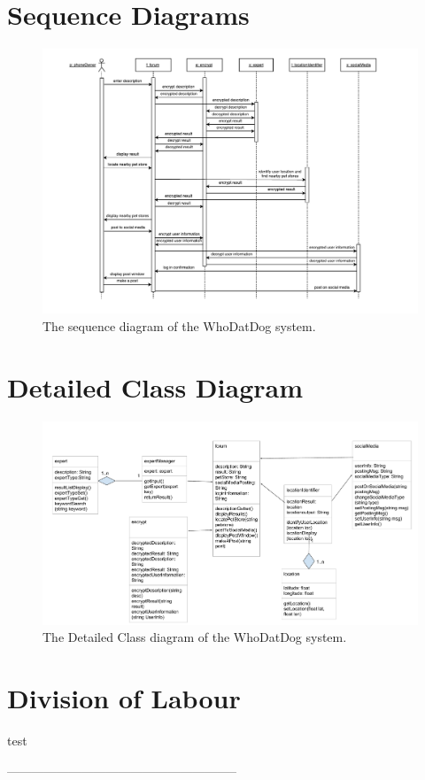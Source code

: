 \documentclass[]{article}
\begin{document}
\section{Sequence Diagrams}
\label{sec:sequence_diagrams}
\begin{figure}[H]
	\centering
	\includegraphics[width=\textwidth]{sequencediagram.pdf}
	\caption{\label{fig:analysisclassdiagram}The sequence diagram of the WhoDatDog system.}
\end{figure}

\section{Detailed Class Diagram}

\begin{figure}[H]
	\centering
	\includegraphics[width=\textwidth]{DetailClassDiagram.pdf}
	\caption{\label{fig:analysisclassdiagram}The Detailed Class diagram of the WhoDatDog system.}
\end{figure}

\appendix
\section{Division of Labour}


test

\newpage
--------------------------------------------------------
\end{document}
